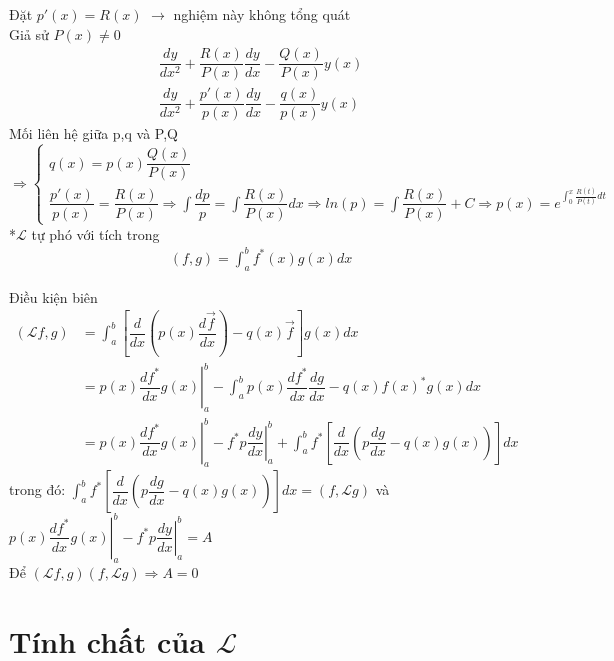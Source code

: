 \documentclass{report}
\begin{document}
Đặt $p'(x) = R(x)$ $\rightarrow$ nghiệm này không tổng quát\\
Giả sử $P(x)\neq0$
\begin{align}
	\dfrac{dy}{dx^2}+\dfrac{R(x)}{P(x)}\dfrac{dy}{dx} - \dfrac{Q(x)}{P(x)}y(x) \\
	\dfrac{dy}{dx^2}+\dfrac{p'(x)}{p(x)}\dfrac{dy}{dx} - \dfrac{q(x)}{p(x)}y(x)
\end{align}
Mối liên hệ giữa p,q và P,Q
\[
	\Rightarrow
	\begin{cases}
		q(x) = p(x)\dfrac{Q(x)}{P(x)} \\
		\dfrac{p'(x)}{p(x)}= \dfrac{R(x)}{P(x)}\Rightarrow \displaystyle\int \dfrac{dp}{p}=\int \dfrac{R(x)}{P(x)}dx \Rightarrow ln(p) = \int \dfrac{R(x)}{P(x)} + C \Rightarrow p(x)=e^{\int_{0}^{x}\frac{R(t)}{P(t)}dt }
	\end{cases}
\]
*$\mathcal{L}$ tự phó với tích trong
\begin{align*}
	(f,g) = \int_{a}^{b}f^{*}(x)g(x)dx
\end{align*}

Điều kiện biên
\begin{align*}
	(\mathcal{L}f,g) & =\int_{a}^{b}\left[\dfrac{d}{dx}\left( p(x)\dfrac{d\vec{f}}{dx} \right) - q(x)\vec{f}\right]g(x)dx                                                                            \\
	                 & = \left. p(x)\dfrac{df^*}{dx}g(x)\right|_a^b - \int_{a}^{b}p(x)\dfrac{df^*}{dx}\dfrac{dg}{dx} - q(x)f(x)^* g(x) dx                                                            \\
	                 & = \left. p(x)\dfrac{df^*}{dx}g(x)\right|_a^b - \left.  f^*p\dfrac{dy}{dx} \right|_a^b + \int_{a}^{b} f^*\left[ \dfrac{d}{dx}\left(p\dfrac{dg}{dx} - q(x)g(x)\right) \right]dx
\end{align*}
trong đó: $\displaystyle\int_{a}^{b} f^*\left[ \dfrac{d}{dx}\left(p\dfrac{dg}{dx} - q(x)g(x)\right) \right]dx = (f,\mathcal{L}g)$ và $ \left. p(x)\dfrac{df^*}{dx}g(x)\right|_a^b - \left.  f^*p\dfrac{dy}{dx} \right|_a^b = A$ \\
Để $(\mathcal{L}f,g) (f,\mathcal{L}g) \Rightarrow A = 0 $

\section{Tính chất của $\mathcal{L}$}
\end{document}
